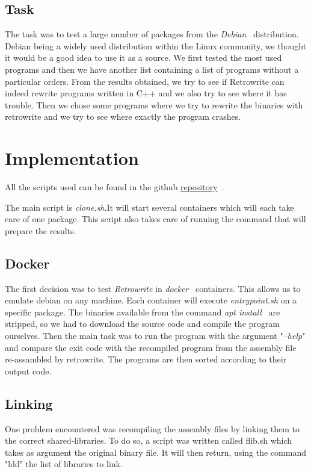 \documentclass[a4paper,11pt,oneside]{report}
\begin{document}
\section{Task}
The task was to test a large number of packages from the \textit{Debian}~\cite{debian} distribution.
Debian being a widely used distribution within the Linux community, we thought
it would be a good idea to use it as a source. We first tested the most used
programs and then we have another list containing a list of programs without a
particular orders. From the results obtained, we try to see if Retrowrite can
indeed rewrite programs written in C++ and we also try to see where it has
trouble. Then we chose some programs where we try to rewrite the binaries with retrowrite
and we try to see where exactly the program crashes.


\chapter{Implementation}
All the scripts used can be found in the github 
\href{https://github.com/ha2san/debian_docker/tree/main/scripts}{repository}~\cite{repo}.

The main script is \textit{clone.sh}.It will start several containers which will
each take care of one package. This script also takes care of running the
command that will prepare the results.

\section{Docker}
The first decision was to test \textit{Retrowrite} in
\textit{docker}~\cite{merkel2014docker} containers. This allows us to emulate debian on
any machine. Each container will execute \textit{entrypoint.sh} on a specific package. The
binaries available from the command \textit{apt install}~\cite{apt} are stripped, so
we had to download the source code and compile the program ourselves. Then the
main task was to run the program with the argument "\textit{--help}" and
compare the exit code with the recompiled program from the assembly file
re-assambled by retrowrite. The programs are then sorted according to their
output code.

\section{Linking}
One problem encountered was recompiling the
assembly files by linking them to the correct shared-libraries. To do so, a 
script was written called flib.sh which takes as argument the original binary
file. It will then return, using the command "ldd"\cite{ldd} the list of
libraries to link. 
\end{document}
